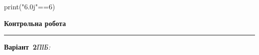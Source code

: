 \documentclass[11pt]{article}
\begin{document}
print("6.0j"==6)
\par\vspace{5mm}




































































































\newpage

\newpage

{\centering\Large\bfseries Контрольна робота\par}
\medskip
\noindent\rule{\linewidth}{0.5pt}
\smallskip
\noindent\textbf{Варіант \No\,2}\hfill \textit{ПІБ:}\,\underline{\hspace{60mm}}
\vspace{4mm}
\end{document}
